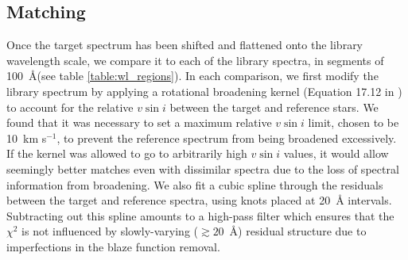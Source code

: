 \documentclass[preprint2]{aastex6}
\newcommand{\chisq}{\ensuremath{\chi^2}\xspace}
\newcommand{\vsini}{\ensuremath{v \sin i}\xspace}
\newcommand{\kms}{km s$^{-1}$\xspace}
\newcommand{\angstrom}{\AA\xspace}
\begin{document}
\begin{figure*}
	\caption{Solar reference spectrum and spectrum of HD190406 (spectral type G0V) before and after registration (see \autoref{ssec:shifting}). \label{fig:shifted_spec}}
\end{figure*}

\begin{figure*}
	\caption{Cross-correlation of the different segments in a single order of the spectrum of Barnard's star (GL669, spectral type M4V), against the solar spectrum (left) and an M dwarf spectrum (right). Due to the dissimilarity in spectra, the cross-correlation with the solar spectrum gives multiple peaks which do not correspond to the true shift, whereas the previously-shifted M dwarf spectrum serves as a better reference (see \autoref{ssec:shifting}). \label{fig:bootstrap_corr}}
\end{figure*}

\begin{figure*}
	\caption{Spectrum of Barnard's star (GL699, spectral type M4V) when shifted against the solar spectrum (bottom) and against a previously shifted template M dwarf spectrum (top). The solar spectrum, which was chosen to be the library rest wavelength scale, is overlaid in gray. Red arrows indicate specific spectral features which are properly aligned only when the target spectrum is shifted against the M dwarf reference. Using the bootstrapping approach described in \autoref{ssec:shifting} to derive a ladder of wavelength standards of different spectral types, we achieve superior spectral registration. \label{fig:bootstrap_spectrum}}
\end{figure*}

\subsection{Matching} 
\label{ssec:matching}
Once the target spectrum has been shifted and flattened onto the library wavelength scale, we compare it to each of the library spectra, in segments of 100~\angstrom (see table \ref{table:wl_regions}). In each comparison, we first modify the library spectrum by applying a rotational broadening kernel (Equation 17.12 in \citealt{Gray92}) to account for the relative \vsini between the target and reference stars. We found that it was necessary to set a maximum relative \vsini limit, chosen to be 10~\kms, to prevent the reference spectrum from being broadened excessively. If the kernel was allowed to go to arbitrarily high \vsini values, it would allow seemingly better matches even with dissimilar spectra due to the loss of spectral information from broadening. We also fit a cubic spline through the residuals between the target and reference spectra, using knots placed at 20~\angstrom intervals. Subtracting out this spline amounts to a high-pass filter which ensures that the \chisq is not influenced by slowly-varying ($\gtrsim  20$~\angstrom) residual structure due to imperfections in the blaze function removal.
\end{document}
